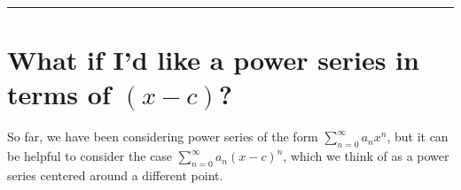 \documentclass{ximera}
\begin{document}
\begin{question}
\begin{solution}
    \begin{multiple-choice}
    \end{multiple-choice}

  \end{solution}
\end{question}
            
\hrule

\section{What if I'd like a power series in terms of \((x-c)\)?}

So far, we have been considering power series of the form \(\sum_{n=0}^\infty a_n x^n\), but it can be helpful to consider the case \(\sum_{n=0}^\infty a_n (x-c)^n\), which we think of as a power series centered around a different point.

\end{document}
